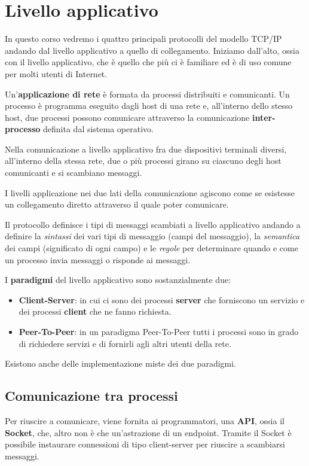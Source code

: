 \chapter{Livello applicativo}
In questo corso vedremo i quattro principali protocolli del modello 
TCP/IP andando dal livello applicativo a quello di collegamento. 
Iniziamo dall'alto, ossia con il livello applicativo, che è quello che
più ci è familiare ed è di uso comune per molti utenti di Internet.

Un'\textbf{applicazione di rete} è formata da processi distribuiti e 
comunicanti. Un processo è programma eseguito dagli host di una rete 
e, all'interno dello stesso host, due processi possono comunicare 
attraverso la comunicazione \textbf{inter-processo} definita dal 
sistema operativo.

Nella comunicazione a livello applicativo fra due dispositivi terminali
diversi, all'interno della stessa rete, due o più processi girano su 
ciascuno degli host comunicanti e si scambiano messaggi.

I livelli applicazione nei due lati della comunicazione agiscono come 
se esistesse un collegamento diretto attraverso il quale poter 
comunicare.

Il protocollo definisce i tipi di messaggi scambiati a livello 
applicativo andando a definire la \emph{sintassi} dei vari tipi di 
messaggio (campi del messaggio), la \emph{semantica} dei campi 
(significato di ogni campo) e le \emph{regole} per determinare quando 
e come un processo invia messaggi o risponde ai messaggi.

I \textbf{paradigmi} del livello applicativo sono sostanzialmente due:
\begin{itemize}
	\item \textbf{Client-Server}: in cui ci sono dei processi 
		\textbf{server} che forniscono un servizio e dei processi 
		\textbf{client} che ne fanno richiesta.
	\item \textbf{Peer-To-Peer}: in un paradigma Peer-To-Peer tutti i 
		processi sono in grado di richiedere servizi e di fornirli 
		agli altri utenti della rete.
\end{itemize}
Esistono anche delle implementazione miste dei due paradigmi.

\section{Comunicazione tra processi}
Per riuscire a comunicare, viene fornita ai programmatori, una
\textbf{API}, ossia il \textbf{Socket}, che, altro non è che
un'astrazione di un endpoint. Tramite il Socket è possibile instaurare 
connessioni di tipo client-server per riuscire a scambiarsi messaggi.


